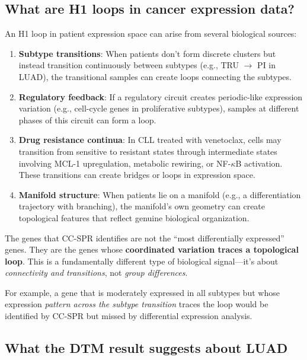 \documentclass[11pt]{article}
\begin{document}
\subsection{What are H1 loops in cancer expression data?}

An H1 loop in patient expression space can arise from several biological sources:

\begin{enumerate}[leftmargin=1.5em]
    \item \textbf{Subtype transitions}: When patients don't form discrete clusters but instead transition continuously between subtypes (e.g., TRU $\to$ PI in LUAD), the transitional samples can create loops connecting the subtypes.

    \item \textbf{Regulatory feedback}: If a regulatory circuit creates periodic-like expression variation (e.g., cell-cycle genes in proliferative subtypes), samples at different phases of this circuit can form a loop.

    \item \textbf{Drug resistance continua}: In CLL treated with venetoclax, cells may transition from sensitive to resistant states through intermediate states involving MCL-1 upregulation, metabolic rewiring, or NF-$\kappa$B activation. These transitions can create bridges or loops in expression space.

    \item \textbf{Manifold structure}: When patients lie on a manifold (e.g., a differentiation trajectory with branching), the manifold's own geometry can create topological features that reflect genuine biological organization.
\end{enumerate}

\begin{takeaway}
The genes that CC-SPR identifies are not the ``most differentially expressed'' genes. They are the genes whose \textbf{coordinated variation traces a topological loop}. This is a fundamentally different type of biological signal---it's about \emph{connectivity and transitions}, not \emph{group differences}.

For example, a gene that is moderately expressed in all subtypes but whose expression \emph{pattern across the subtype transition} traces the loop would be identified by CC-SPR but missed by differential expression analysis.
\end{takeaway}

\subsection{What the DTM result suggests about LUAD}
\end{document}
